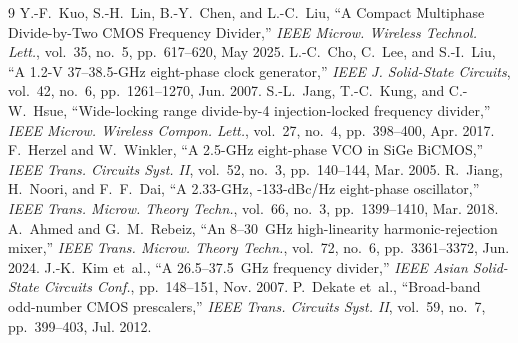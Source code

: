 \documentclass[journal]{IEEEtran}
\begin{document}
\begin{thebibliography}{9}
 Y.-F.~Kuo, S.-H.~Lin, B.-Y.~Chen, and L.-C.~Liu, ``A Compact Multiphase Divide-by-Two CMOS Frequency Divider,'' \textit{IEEE Microw. Wireless Technol. Lett.}, vol.~35, no.~5, pp.~617--620, May 2025.
 L.-C.~Cho, C.~Lee, and S.-I.~Liu, ``A 1.2-V 37--38.5-GHz eight-phase clock generator,'' \textit{IEEE J. Solid-State Circuits}, vol.~42, no.~6, pp.~1261--1270, Jun. 2007.
 S.-L.~Jang, T.-C.~Kung, and C.-W.~Hsue, ``Wide-locking range divide-by-4 injection-locked frequency divider,'' \textit{IEEE Microw. Wireless Compon. Lett.}, vol.~27, no.~4, pp.~398--400, Apr. 2017.
 F.~Herzel and W.~Winkler, ``A 2.5-GHz eight-phase VCO in SiGe BiCMOS,'' \textit{IEEE Trans. Circuits Syst. II}, vol.~52, no.~3, pp.~140--144, Mar. 2005.
 R.~Jiang, H.~Noori, and F.~F.~Dai, ``A 2.33-GHz, -133-dBc/Hz eight-phase oscillator,'' \textit{IEEE Trans. Microw. Theory Techn.}, vol.~66, no.~3, pp.~1399--1410, Mar. 2018.
 A.~Ahmed and G.~M.~Rebeiz, ``An 8--30~GHz high-linearity harmonic-rejection mixer,'' \textit{IEEE Trans. Microw. Theory Techn.}, vol.~72, no.~6, pp.~3361--3372, Jun. 2024.
 J.-K.~Kim et~al., ``A 26.5--37.5~GHz frequency divider,'' \textit{IEEE Asian Solid-State Circuits Conf.}, pp.~148--151, Nov. 2007.
 P.~Dekate et~al., ``Broad-band odd-number CMOS prescalers,'' \textit{IEEE Trans. Circuits Syst. II}, vol.~59, no.~7, pp.~399--403, Jul. 2012.
\end{thebibliography}
\end{document}
